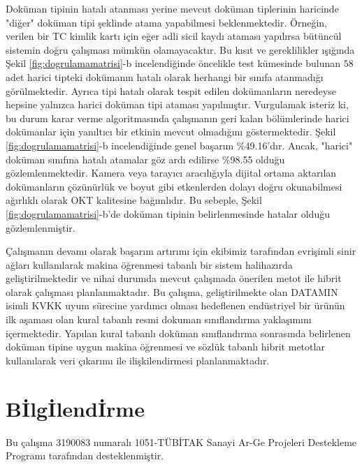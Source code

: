 \documentclass[conference, a4paper]{IEEEtran}
\begin{document}
Doküman tipinin hatalı atanması yerine mevcut doküman tiplerinin haricinde "diğer" doküman tipi şeklinde atama
yapabilmesi beklenmektedir. Örneğin, verilen bir TC kimlik kartı için eğer adli sicil kaydı ataması yapılırsa
bütüncül sistemin doğru çalışması mümkün olamayacaktır. Bu kısıt ve gereklilikler ışığında Şekil
\ref{fig:dogrulamamatrisi}-b incelendiğinde öncelikle test kümesinde bulunan $58$ adet harici tipteki dokümanın hatalı
olarak herhangi bir sınıfa atanmadığı görülmektedir. Ayrıca tipi hatalı olarak tespit edilen dokümanların neredeyse
hepsine yalnızca harici doküman tipi ataması yapılmıştır. Vurgulamak isteriz ki, bu durum karar verme algoritmasında
çalışmanın geri kalan bölümlerinde harici dokümanlar için yanıltıcı bir etkinin mevcut olmadığını göstermektedir. Şekil
\ref{fig:dogrulamamatrisi}-b incelendiğinde genel başarım \%49.16'dır. Ancak, "harici" doküman sınıfına hatalı
atamalar göz ardı edilirse \%98.55 olduğu gözlemlenmektedir. Kamera veya tarayıcı aracılığıyla dijital ortama aktarılan
dokümanların çözünürlük ve boyut gibi etkenlerden dolayı doğru okunabilmesi ağırlıklı olarak OKT kalitesine bağımlıdır.
Bu sebeple, Şekil \ref{fig:dogrulamamatrisi}-b'de doküman tipinin belirlenmesinde hatalar olduğu gözlemlenmiştir.

Çalışmanın devamı olarak başarım artırımı için ekibimiz tarafından evrişimli sinir ağları kullanılarak makina
öğrenmesi tabanlı bir sistem halihazırda geliştirilmektedir ve nihai durumda mevcut çalışmada önerilen metot ile hibrit
olarak çalışması planlanmaktadır. Bu çalışma, geliştirilmekte olan DATAMIN isimli KVKK uyum sürecine yardımcı olması
hedeflenen endüstriyel bir ürünün ilk aşaması olan kural tabanlı resmi dokuman sınıflandırma yaklaşımını içermektedir.
Yapılan kural tabanlı doküman sınıflandırma sonrasında belirlenen doküman tipine uygun makina öğrenmesi ve sözlük
tabanlı hibrit metotlar kullanılarak veri çıkarımı ile ilişkilendirmesi planlanmaktadır.

\section*{B{\footnotesize İ}lg{\footnotesize İ}lend{\footnotesize İ}rme}
Bu çalışma 3190083 numaralı 1051-TÜBİTAK Sanayi Ar-Ge Projeleri Destekleme Programı tarafından desteklenmiştir.



\end{document}

